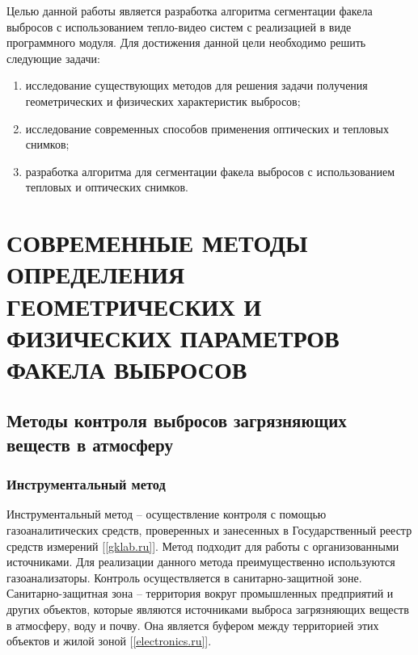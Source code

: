 \documentclass[14pt, a4paper]{extreport}
\begin{document}
	Целью данной работы является разработка алгоритма сегментации факела выбросов с использованием тепло-видео систем с реализацией в виде программного модуля. Для достижения данной цели необходимо решить следующие задачи:
	\begin{enumerate}[label={\arabic*)}]
		\item исследование существующих методов для решения задачи получения геометрических и физических характеристик выбросов;
		\item исследование современных способов применения оптических и тепловых снимков;
		\item разработка алгоритма для сегментации факела выбросов с использованием тепловых и оптических снимков.
	\end{enumerate}
	
	\chapter [\vspace*{-0.22cm}СОВРЕМЕННЫЕ МЕТОДЫ ОПРЕДЕЛЕНИЯ ГЕОМЕТРИЧЕСКИХ \hspace*{-0.5cm} И ФИЗИЧЕСКИХ ПАРАМЕТРОВ ФАКЕЛА ВЫБРОСОВ]{\vspace*{-0.22cm}СОВРЕМЕННЫЕ МЕТОДЫ ОПРЕДЕЛЕНИЯ ГЕОМЕТРИЧЕСКИХ И ФИЗИЧЕСКИХ ПАРАМЕТРОВ ФАКЕЛА ВЫБРОСОВ}
	\section {Методы контроля выбросов загрязняющих веществ в атмосферу}
	\subsection {Инструментальный метод}
	Инструментальный метод -- осуществление контроля с помощью газоаналитических средств, проверенных и занесенных в Государственный реестр средств измерений [\ref{gklab.ru}]. Метод подходит для работы с организованными источниками. Для реализации данного метода преимущественно используются газоанализаторы. Контроль осуществляется в санитарно-защитной зоне. Санитарно-защитная зона -- территория вокруг промышленных предприятий и других объектов, которые являются источниками выброса загрязняющих веществ в атмосферу, воду и почву. Она является буфером между территорией этих объектов и жилой зоной [\ref{electronics.ru}].
	
\end{document}
